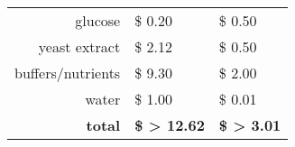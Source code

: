 \documentclass[10pt]{article} %
\begin{document}
\setlength{\tabcolsep}{0.33em} 
\flushleft

\begin{tabular}{rP{3cm}P{3cm}}
  \toprule
     &
     &
     \\
  \midrule
    glucose
      & \$ 0.20
      & \$ 0.50 \\
    yeast extract
      & \$ 2.12
      & \$ 0.50 \\
    buffers/nutrients
      & \$ 9.30
      & \$ 2.00 \\
    water
      & \$ 1.00
      & \$ 0.01 \\
    \textbf{total}
      & \textbf{\$ > 12.62}
      & \textbf{\$ > 3.01} \\
  \bottomrule
\end{tabular}
\end{document}
